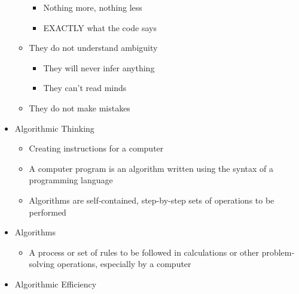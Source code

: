 \begin{itemize}
\begin{itemize}
\begin{itemize}
          \item Nothing more, nothing less
            
          \item EXACTLY what the code says

        \end{itemize}

      \item They do not understand ambiguity

        \begin{itemize}

          \item They will never infer anything

          \item They can't read minds

        \end{itemize}

      \item They do not make mistakes

    \end{itemize}

  \item Algorithmic Thinking

    \begin{itemize}

      \item Creating instructions for a computer

      \item A computer program is an algorithm written using the syntax of a programming language

      \item Algorithms are self-contained, step-by-step sets of operations to be performed

    \end{itemize}

  \item Algorithms

    \begin{itemize}

      \item A process or set of rules to be followed in calculations or other problem-solving operations, especially by a computer

    \end{itemize}

  \item Algorithmic Efficiency

    \begin{itemize}


\end{itemize}
\end{itemize}
